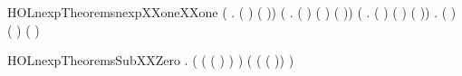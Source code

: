 \newcommand{\HOLnexpTheoremsnexpXXdistinctXXclauses}{\UseVerbatim{HOLnexpTheoremsnexpXXdistinctXXclauses}}
\begin{SaveVerbatim}{HOLnexpTheoremsnexpXXoneXXone}
\HOLTokenTurnstile{} (\HOLSymConst{\HOLTokenForall{}} . (  \HOLSymConst{=}  ) \HOLSymConst{\HOLTokenEquiv{}} ( \HOLSymConst{=} )) \HOLSymConst{\HOLTokenConj{}}
   (\HOLSymConst{\HOLTokenForall{}}   .
      (   \HOLSymConst{=}   ) \HOLSymConst{\HOLTokenEquiv{}} ( \HOLSymConst{=} ) \HOLSymConst{\HOLTokenConj{}} ( \HOLSymConst{=} )) \HOLSymConst{\HOLTokenConj{}}
   (\HOLSymConst{\HOLTokenForall{}}   .
      (   \HOLSymConst{=}   ) \HOLSymConst{\HOLTokenEquiv{}} ( \HOLSymConst{=} ) \HOLSymConst{\HOLTokenConj{}} ( \HOLSymConst{=} )) \HOLSymConst{\HOLTokenConj{}}
   \HOLSymConst{\HOLTokenForall{}}   .
     (   \HOLSymConst{=}   ) \HOLSymConst{\HOLTokenEquiv{}} ( \HOLSymConst{=} ) \HOLSymConst{\HOLTokenConj{}} ( \HOLSymConst{=} )
\end{SaveVerbatim}
\newcommand{\HOLnexpTheoremsnexpXXoneXXone}{\UseVerbatim{HOLnexpTheoremsnexpXXoneXXone}}
\begin{SaveVerbatim}{HOLnexpTheoremsSubXXZero}
\HOLTokenTurnstile{} \HOLSymConst{\HOLTokenForall{}}.
     ( ( ( ) ) \HOLSymConst{=} ) \HOLSymConst{\HOLTokenConj{}}
     ( (  ( )) \HOLSymConst{=}  )
\end{SaveVerbatim}

